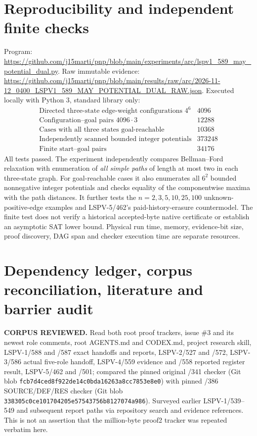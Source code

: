 \documentclass[11pt]{article}
\begin{document}
\section*{Reproducibility and independent finite checks}
Program:
\url{https://github.com/j15marti/pnp/blob/main/experiments/arc/lspv1_589_may_potential_dual.py}.
Raw immutable evidence:
\url{https://github.com/j15marti/pnp/blob/main/results/raw/arc/2026-11-12_0400_LSPV1_589_MAY_POTENTIAL_DUAL_RAW.json}.
Executed locally with Python 3, standard library only:
\[
 \begin{array}{lr}
 \text{Directed three-state edge-weight configurations }4^6 & 4096\\
 \text{Configuration--goal pairs }4096\cdot3 & 12288\\
 \text{Cases with all three states goal-reachable}&10368\\
 \text{Independently scanned bounded integer potentials}&373248\\
 \text{Finite start--goal pairs}&34176
 \end{array}
\]
All tests passed. The experiment independently compares Bellman--Ford
relaxation with enumeration of \emph{all simple paths} of length at most
two in each three-state graph. For goal-reachable cases it also enumerates
all \(6^2\) bounded nonnegative integer potentials and checks equality of
the componentwise maxima with the path distances. It further tests the
\(n=2,3,5,10,25,100\) unknown-positive-edge examples and LSPV-5/462's
paid-history-erasure countermodel. The finite test does not verify
a historical accepted-byte native certificate or establish an asymptotic
SAT lower bound. Physical run time, memory, evidence-bit size, proof
discovery, DAG span and checker execution time are separate resources.

\section*{Dependency ledger, corpus reconciliation, literature and barrier audit}
\noindent\textbf{CORPUS REVIEWED.} Read both root proof trackers,
issue \#3 and its newest role comments, root AGENTS.md and CODEX.md,
project research skill, LSPV-1/588 and /587 exact handoffs and reports,
LSPV-2/527 and /572, LSPV-3/586 actual five-role handoff,
LSPV-4/559 evidence and /558 reported register result,
LSPV-5/462 and /501; compared the pinned original /341 checker
(Git blob \texttt{fcb7d4ced8f922de14c0bda16263a8cc7853e8e0})
with pinned /386 SOURCE/DEF/RES checker
(Git blob \texttt{338305c0ce101704205e57543756b8127074a986}).
Surveyed earlier LSPV-1/539--549 and subsequent report paths via
repository search and evidence references. This is not an assertion
that the million-byte proof2 tracker was repeated verbatim here.
\end{document}
